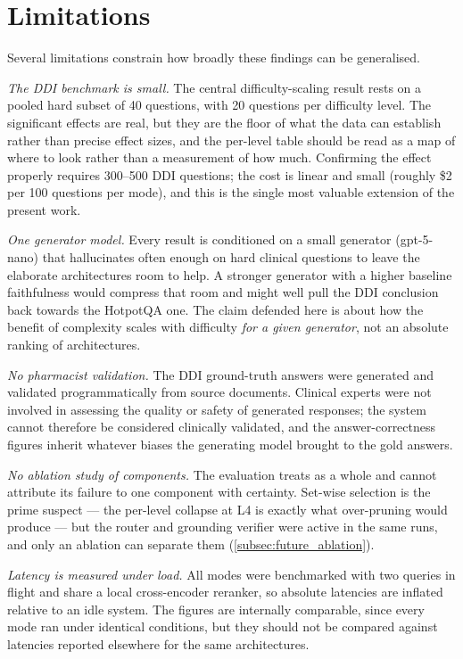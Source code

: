 \section{Limitations}
\label{sec:limitations}

Several limitations constrain how broadly these findings can be generalised.

\emph{The DDI benchmark is small.}
The central difficulty-scaling result rests on a pooled hard subset of 40
questions, with 20 questions per difficulty level.
The significant effects are real, but they are the floor of what the data can
establish rather than precise effect sizes, and the per-level table should be read
as a map of where to look rather than a measurement of how much.
Confirming the effect properly requires 300--500 DDI questions; the cost is linear
and small (roughly \$2 per 100 questions per mode), and this is the single most
valuable extension of the present work.

\emph{One generator model.}
Every result is conditioned on a small generator (gpt-5-nano) that hallucinates
often enough on hard clinical questions to leave the elaborate architectures room
to help.
A stronger generator with a higher baseline faithfulness would compress that room
and might well pull the DDI conclusion back towards the HotpotQA one.
The claim defended here is about how the benefit of complexity scales with
difficulty \emph{for a given generator}, not an absolute ranking of architectures.

\emph{No pharmacist validation.}
The DDI ground-truth answers were generated and validated programmatically from
source documents.
Clinical experts were not involved in assessing the quality or safety of
generated responses; the system cannot therefore be considered clinically validated,
and the answer-correctness figures inherit whatever biases the generating model
brought to the gold answers.

\emph{No ablation study of \rarerag{} components.}
The evaluation treats \rarerag{} as a whole and cannot attribute its failure to
one component with certainty.
Set-wise selection is the prime suspect --- the per-level collapse at L4 is exactly
what over-pruning would produce --- but the router and grounding verifier were
active in the same runs, and only an ablation can separate them
(\cref{subsec:future_ablation}).

\emph{Latency is measured under load.}
All modes were benchmarked with two queries in flight and share a local
cross-encoder reranker, so absolute latencies are inflated relative to an idle
system.
The figures are internally comparable, since every mode ran under identical
conditions, but they should not be compared against latencies reported elsewhere
for the same architectures.

